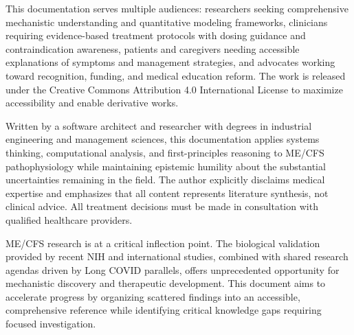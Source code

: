 This documentation serves multiple audiences: researchers seeking comprehensive mechanistic understanding and quantitative modeling frameworks, clinicians requiring evidence-based treatment protocols with dosing guidance and contraindication awareness, patients and caregivers needing accessible explanations of symptoms and management strategies, and advocates working toward recognition, funding, and medical education reform. The work is released under the Creative Commons Attribution 4.0 International License to maximize accessibility and enable derivative works.

Written by a software architect and researcher with degrees in industrial engineering and management sciences, this documentation applies systems thinking, computational analysis, and first-principles reasoning to ME/CFS pathophysiology while maintaining epistemic humility about the substantial uncertainties remaining in the field. The author explicitly disclaims medical expertise and emphasizes that all content represents literature synthesis, not clinical advice. All treatment decisions must be made in consultation with qualified healthcare providers.

ME/CFS research is at a critical inflection point. The biological validation provided by recent NIH and international studies, combined with shared research agendas driven by Long COVID parallels, offers unprecedented opportunity for mechanistic discovery and therapeutic development. This document aims to accelerate progress by organizing scattered findings into an accessible, comprehensive reference while identifying critical knowledge gaps requiring focused investigation.

